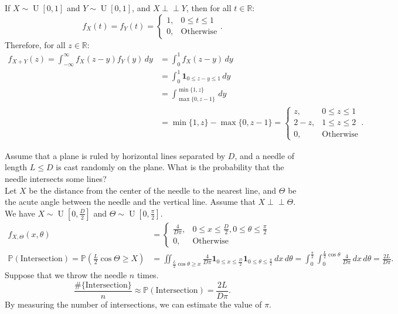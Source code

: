 \documentclass{huhtakm-template-book-v2}
\newcommand{\independent}{\perp\!\!\!\perp}
\newcommand{\prob}{\mathbb{P}}
\DeclareMathOperator{\U}{U}
\begin{document}
    \begin{eg}
        If $X \sim \U[0,1]$ and $Y \sim \U[0,1]$, and $X \independent Y$, then for all $t \in \mathbb{R}$:
        \begin{equation*}
            f_{X}(t) = f_{Y}(t) = \begin{cases}
                1, &0 \leq t \leq 1\\
                0, &\text{Otherwise}
            \end{cases}.
        \end{equation*}
        Therefore, for all $z \in \mathbb{R}$:
        \begin{align*}
            f_{X+Y}(z) = \int_{-\infty}^{\infty} f_{X}(z-y)f_{Y}(y)\,dy &= \int_{0}^{1}f_{X}(z-y)\,dy\\
            &= \int_{0}^{1}\mathbf{1}_{0 \leq z-y \leq 1}\,dy\\
            \tag{$z-1 \leq y \leq z$}
            &= \int_{\max\{0,z-1\}}^{\min\{1,z\}}\,dy\\
            &= \min\{1,z\}-\max\{0,z-1\} = \begin{cases}
                z, &0 \leq z \leq 1\\
                2-z, &1 \leq z \leq 2\\
                0, &\text{Otherwise}
            \end{cases}.
        \end{align*}
    \end{eg}
    \begin{eg}
        Assume that a plane is ruled by horizontal lines separated by $D$, and a needle of length $L \leq D$ is cast randomly on the plane. What is the probability that the needle intersects some lines?\\
        Let $X$ be the distance from the center of the needle to the nearest line, and $\Theta$ be the acute angle between the needle and the vertical line. Assume that $X \independent\Theta$. We have $X \sim \U\left[0,\frac{D}{2}\right]$ and $\Theta \sim \U\left[0,\frac{\pi}{2}\right]$.
        \begin{align*}
            f_{X,\Theta}(x,\theta) &= \begin{cases}
                \frac{4}{D\pi}, &0 \leq x \leq \frac{D}{2},0 \leq \theta \leq \frac{\pi}{2}\\
                0, &\text{Otherwise}
            \end{cases}\\
            \prob(\text{Intersection}) = \prob\left(\frac{L}{2}\cos\Theta \geq X\right) &= \iint_{\frac{L}{2}\cos\theta \geq x}\frac{4}{D\pi}\mathbf{1}_{0 \leq x \leq \frac{D}{2}}\mathbf{1}_{0 \leq \theta \leq \frac{\pi}{2}}\,dx\,d\theta = \int_{0}^{\frac{\pi}{2}}\int_{0}^{\frac{L}{2}\cos\theta}\frac{4}{D\pi}\,dx\,d\theta = \frac{2L}{D\pi}.
        \end{align*}
        Suppose that we throw the needle $n$ times.
        \begin{equation*}
            \frac{\#\{\text{Intersection}\}}{n} \approx \prob(\text{Intersection}) = \frac{2L}{D\pi}.
        \end{equation*}
        By measuring the number of intersections, we can estimate the value of $\pi$.
    \end{eg}
\end{document}
